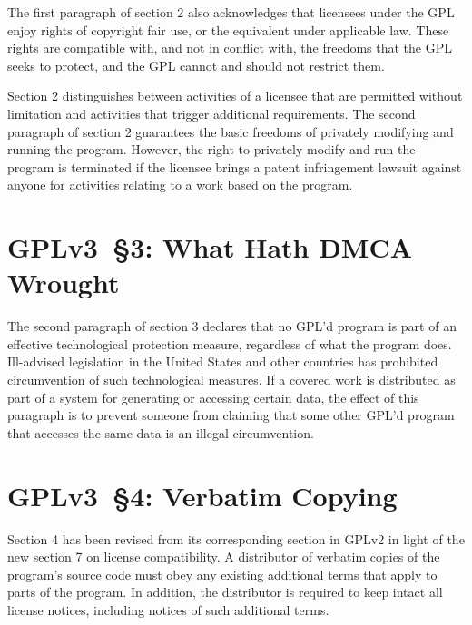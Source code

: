 The first paragraph of section 2 also acknowledges that licensees under the
GPL enjoy rights of copyright fair use, or the equivalent under applicable
law. These rights are compatible with, and not in conflict with, the freedoms
that the GPL seeks to protect, and the GPL cannot and should not restrict
them.


Section 2 distinguishes between activities of a licensee that are permitted
without limitation and activities that trigger additional requirements. The
second paragraph of section 2 guarantees the basic freedoms of privately
modifying and running the program. However, the right to privately modify and
run the program is terminated if the licensee brings a patent infringement
lawsuit against anyone for activities relating to a work based on the
program.


\section{GPLv3~\S3: What Hath DMCA Wrought}
\label{GPLv3s3}



The second paragraph of section 3 declares that no GPL'd program is part of
an effective technological protection measure, regardless of what the program
does. Ill-advised legislation in the United States and other countries has
prohibited circumvention of such technological measures. If a covered work is
distributed as part of a system for generating or accessing certain data, the
effect of this paragraph is to prevent someone from claiming that some other
GPL'd program that accesses the same data is an illegal circumvention.

\section{GPLv3~\S4: Verbatim Copying}


Section 4 has been revised from its corresponding section in GPLv2 in light
of the new section 7 on license compatibility. A distributor of verbatim
copies of the program's source code must obey any existing additional terms
that apply to parts of the program. In addition, the distributor is required
to keep intact all license notices, including notices of such additional
terms.

